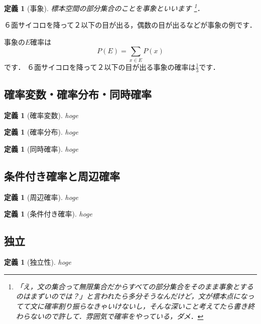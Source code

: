 \documentclass[11pt]{report}
\newtheorem{definition}[theorem]{定義}
\begin{document}
\begin{definition}[事象]
	標本空間の部分集合のことを事象といいます
	\footnote{「え，文の集合って無限集合だからすべての部分集合をそのまま事象とするのはまずいのでは？」と言われたら多分そうなんだけど，文が標本点になってて文に確率割り振らなきゃいけないし，そんな深いこと考えてたら書き終わらないので許して．雰囲気で確率をやっている，ダメ．}．
\end{definition}

６面サイコロを降って２以下の目が出る，偶数の目が出るなどが事象の例です．

事象の$E$確率は
\begin{equation*}
	P(E) = \sum_{x \in E} P(x)
\end{equation*}
です．
６面サイコロを降って２以下の目が出る事象の確率は$\frac{1}{3}$です．

\subsection{確率変数・確率分布・同時確率}

\begin{definition}[確率変数]
	hoge
\end{definition}

\begin{definition}[確率分布]
	hoge
\end{definition}

\begin{definition}[同時確率]
	hoge
\end{definition}

\subsection{条件付き確率と周辺確率}

\begin{definition}[周辺確率]
	hoge
\end{definition}

\begin{definition}[条件付き確率]
	hoge
\end{definition}

\subsection{独立}

\begin{definition}[独立性]
	hoge
\end{definition}
\end{document}
